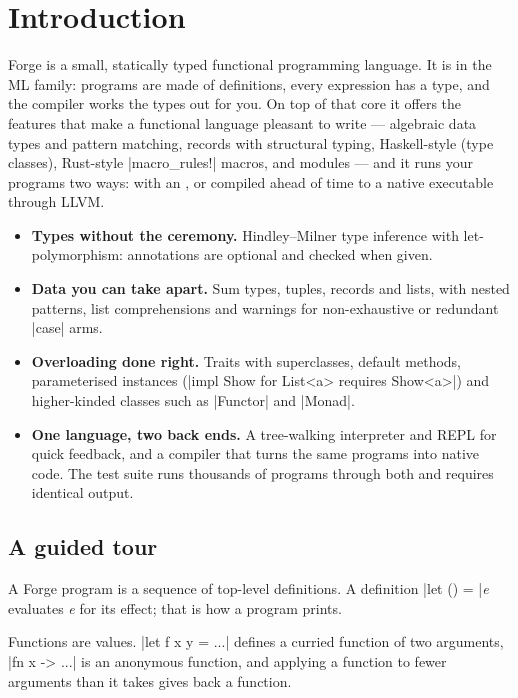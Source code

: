 \chapter{Introduction}
\label{ch:introduction}

Forge is a small, statically typed functional programming language. It is
in the ML family: programs are made of definitions, every expression has a
type, and the compiler works the types out for you. On top of that core it
offers the features that make a functional language pleasant to write ---
algebraic data types and pattern matching, records with structural typing,
Haskell-style  (type classes), Rust-style
\fc|macro_rules!| macros, and modules --- and it runs your programs two ways:
with an , or compiled ahead of time to a native executable
through LLVM.

\begin{itemize}
  \item \textbf{Types without the ceremony.} Hindley--Milner type inference
    with let-polymorphism: annotations are optional and checked when given.
  \item \textbf{Data you can take apart.} Sum types, tuples, records and
    lists, with nested patterns, list comprehensions and warnings for
    non-exhaustive or redundant \fc|case| arms.
  \item \textbf{Overloading done right.} Traits with superclasses, default
    methods, parameterised instances (\fc|impl Show for List<a> requires Show<a>|)
    and higher-kinded classes such as \fc|Functor| and \fc|Monad|.
  \item \textbf{One language, two back ends.} A tree-walking interpreter and
    REPL for quick feedback, and a compiler that turns the same programs into
    native code. The test suite runs thousands of programs through both and
    requires identical output.
\end{itemize}

\section{A guided tour}
\label{sec:tour}

A Forge program is a sequence of top-level definitions. A definition
\fc|let () = |\textit{e} evaluates \textit{e} for its effect; that is how a
program prints.


Functions are values. \fc|let f x y = ...| defines a curried function of two
arguments, \fc|fn x -> ...| is an anonymous function, and applying a function
to fewer arguments than it takes gives back a function.

